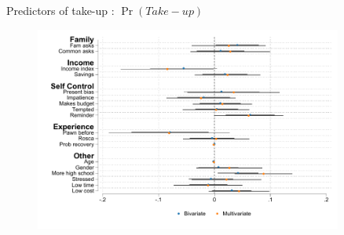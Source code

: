 \documentclass[8pt]{beamer}
\begin{document}
\begin{frame}{Predictors of take-up : $\Pr(Take-up)$}

  

   
\begin{figure}[H]
    \begin{center}
        \includegraphics[width=0.9\textwidth]{Figuras/determinants_takeup_reg.pdf}
    \end{center}
    \end{figure}
\end{frame}
\end{document}
